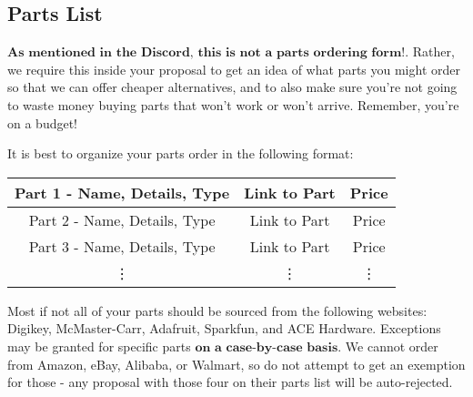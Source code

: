 \documentclass{article}
\begin{document}
\subsection{Parts List}

$\textbf{As mentioned in the Discord, this is not a parts ordering form!}$. Rather, we require this inside your proposal to get an idea of what parts you might order so that we can offer cheaper alternatives, and to also make sure you're not going to waste money buying parts that won't work or won't arrive. Remember, you're on a budget!

\vspace{5mm}

It is best to organize your parts order in the following format:

\begin{center}
\begin{tabular}{ c | c | c }
\hline
 Part 1 - Name, Details, Type & Link to Part & Price \\ 
\hline
 Part 2 - Name, Details, Type  & Link to Part & Price \\  
\hline
 Part 3 - Name, Details, Type  & Link to Part & Price \\  
\hline 
\vdots & \vdots & \vdots 
\end{tabular}
\end{center}

Most if not all of your parts should be sourced from the following websites: Digikey, McMaster-Carr, Adafruit, Sparkfun, and ACE Hardware. Exceptions may be granted for specific parts $\textbf{on a case-by-case basis}$. We cannot order from Amazon, eBay, Alibaba, or Walmart, so do not attempt to get an exemption for those - any proposal with those four on their parts list will be auto-rejected.
\end{document}
